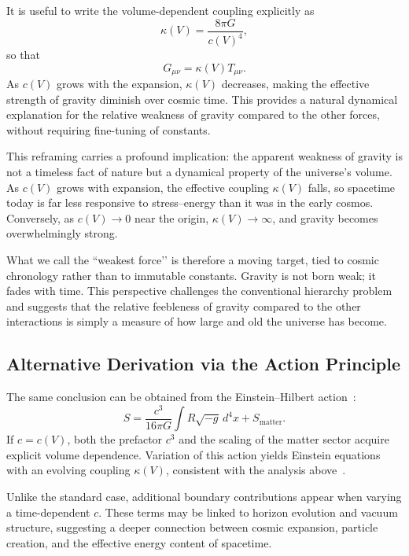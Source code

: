 \documentclass[12pt]{article}
\begin{document}
It is useful to write the volume-dependent coupling explicitly as
\begin{equation}
  \kappa(V) = \frac{8 \pi G}{c(V)^4},
\end{equation}
so that
\begin{equation}
  G_{\mu\nu} = \kappa(V) T_{\mu\nu}.
\end{equation}
As $c(V)$ grows with the expansion, $\kappa(V)$ decreases, making the effective strength of gravity diminish over cosmic time. This provides a natural dynamical explanation for the relative weakness of gravity compared to the other forces, without requiring fine-tuning of constants.

\bigskip

This reframing carries a profound implication: the apparent weakness of gravity is not a timeless fact of nature but a dynamical property of the universe’s volume. As $c(V)$ grows with expansion, the effective coupling $\kappa(V)$ falls, so spacetime today is far less responsive to stress–energy than it was in the early cosmos. Conversely, as $c(V)\to 0$ near the origin, $\kappa(V)\to\infty$, and gravity becomes overwhelmingly strong. 

What we call the ``weakest force’’ is therefore a moving target, tied to cosmic chronology rather than to immutable constants. Gravity is not born weak; it fades with time. This perspective challenges the conventional hierarchy problem and suggests that the relative feebleness of gravity compared to the other interactions is simply a measure of how large and old the universe has become.

\subsection{Alternative Derivation via the Action Principle}

The same conclusion can be obtained from the Einstein–Hilbert action~\cite{waldGR1984,Carroll2004}:
\begin{equation}
  S = \frac{c^3}{16 \pi G} \int R \sqrt{-g} \, d^4x + S_{\text{matter}}.
\end{equation}
If \(c = c(V)\), both the prefactor \(c^3\) and the scaling of the matter sector acquire explicit volume dependence. Variation of this action yields Einstein equations with an evolving coupling \(\kappa(V)\), consistent with the analysis above~\cite{albrecht1999}.

Unlike the standard case, additional boundary contributions appear when varying a time-dependent \(c\). These terms may be linked to horizon evolution and vacuum structure, suggesting a deeper connection between cosmic expansion, particle creation, and the effective energy content of spacetime.
\end{document}
